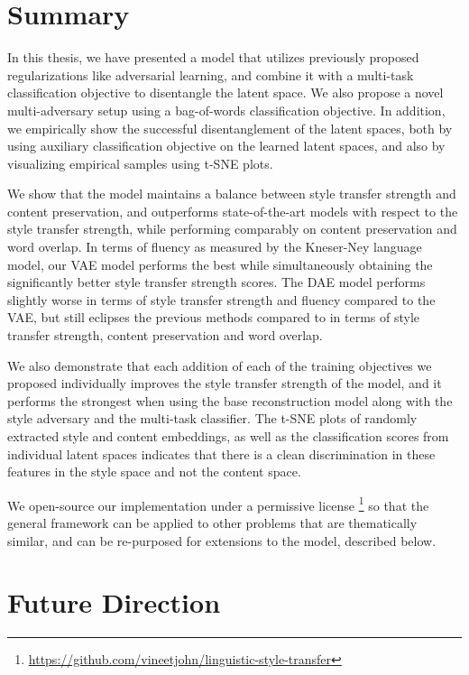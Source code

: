 \section{Summary}

In this thesis, we have presented a model that utilizes previously proposed regularizations like adversarial learning, and combine it with a multi-task classification objective to disentangle the latent space. We also propose a novel multi-adversary setup using a bag-of-words classification objective. In addition,  we empirically show the successful disentanglement of the latent spaces, both by using auxiliary classification objective on the learned latent spaces, and also by visualizing empirical samples using t-SNE plots.

We show that the model maintains a balance between style transfer strength and content preservation, and outperforms state-of-the-art models with respect to the style transfer strength, while performing comparably on content preservation and word overlap. In terms of fluency as measured by the Kneser-Ney language model, our VAE model performs the best while simultaneously obtaining the significantly better style transfer strength scores. The DAE model performs slightly worse in terms of style transfer strength and fluency compared to the VAE, but still eclipses the previous methods compared to in terms of style transfer strength, content preservation and word overlap.

We also demonstrate that each addition of each of the training objectives we proposed individually improves the style transfer strength of the model, and it performs the strongest when using the base reconstruction model along with the style adversary and the multi-task classifier. The t-SNE plots of randomly extracted style and content embeddings, as well as the classification scores from individual latent spaces indicates that there is a clean discrimination in these features in the style space and not the content space.

We open-source our implementation under a permissive license \footnote{\url{https://github.com/vineetjohn/linguistic-style-transfer}} so that the general framework can be applied to other problems that are thematically similar, and can be re-purposed for extensions to the model, described below.


\section{Future Direction}

